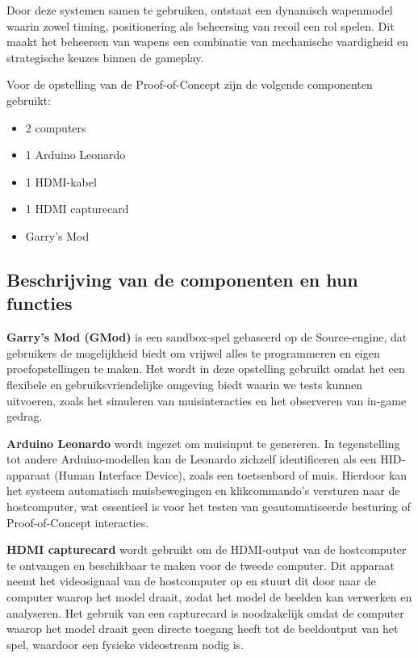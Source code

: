 Door deze systemen samen te gebruiken, ontstaat een dynamisch wapenmodel waarin zowel timing, positionering als beheersing van recoil een rol spelen. Dit maakt het beheersen van wapens een combinatie van mechanische vaardigheid en strategische keuzes binnen de gameplay.


Voor de opstelling van de Proof-of-Concept zijn de volgende componenten gebruikt:
\begin{itemize}
\item 2 computers
\item 1 Arduino Leonardo
\item 1 HDMI-kabel
\item 1 HDMI capturecard
\item Garry's Mod
\end{itemize}

\newpage

\subsection{Beschrijving van de componenten en hun functies}

\textbf{Garry's Mod (GMod)} is een sandbox-spel gebaseerd op de Source-engine, dat gebruikers de mogelijkheid biedt om vrijwel alles te programmeren en eigen proefopstellingen te maken. Het wordt in deze opstelling gebruikt omdat het een flexibele en gebruiksvriendelijke omgeving biedt waarin we tests kunnen uitvoeren, zoals het simuleren van muisinteracties en het observeren van in-game gedrag.

\textbf{Arduino Leonardo} wordt ingezet om muisinput te genereren. In tegenstelling tot andere Arduino-modellen kan de Leonardo zichzelf identificeren als een HID-apparaat (Human Interface Device), zoals een toetsenbord of muis. Hierdoor kan het systeem automatisch muisbewegingen en klikcommando’s versturen naar de hostcomputer, wat essentieel is voor het testen van geautomatiseerde besturing of Proof-of-Concept interacties.

\textbf{HDMI capturecard} wordt gebruikt om de HDMI-output van de hostcomputer te ontvangen en beschikbaar te maken voor de tweede computer. Dit apparaat neemt het videosignaal van de hostcomputer op en stuurt dit door naar de computer waarop het model draait, zodat het model de beelden kan verwerken en analyseren. Het gebruik van een capturecard is noodzakelijk omdat de computer waarop het model draait geen directe toegang heeft tot de beeldoutput van het spel, waardoor een fysieke videostream nodig is.

